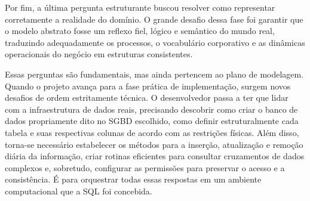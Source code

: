 Por fim, a última pergunta estruturante buscou resolver como representar corretamente a realidade do domínio. O grande desafio dessa fase foi garantir que o modelo abstrato fosse um reflexo fiel, lógico e semântico do mundo real, traduzindo adequadamente os processos, o vocabulário corporativo e as dinâmicas operacionais do negócio em estruturas consistentes.

Essas perguntas são fundamentais, mas ainda pertencem ao plano de modelagem. Quando o projeto avança para a fase prática de implementação, surgem novos desafios de ordem estritamente técnica. O desenvolvedor passa a ter que lidar com a infraestrutura de dados reais, precisando descobrir como criar o banco de dados propriamente dito no SGBD escolhido, como definir estruturalmente cada tabela e suas respectivas colunas de acordo com as restrições físicas. Além disso, torna-se necessário estabelecer os métodos para a inserção, atualização e remoção diária da informação, criar rotinas eficientes para consultar cruzamentos de dados complexos e, sobretudo, configurar as permissões para preservar o acesso e a consistência. É para orquestrar todas essas respostas em um ambiente computacional que a SQL foi concebida.

